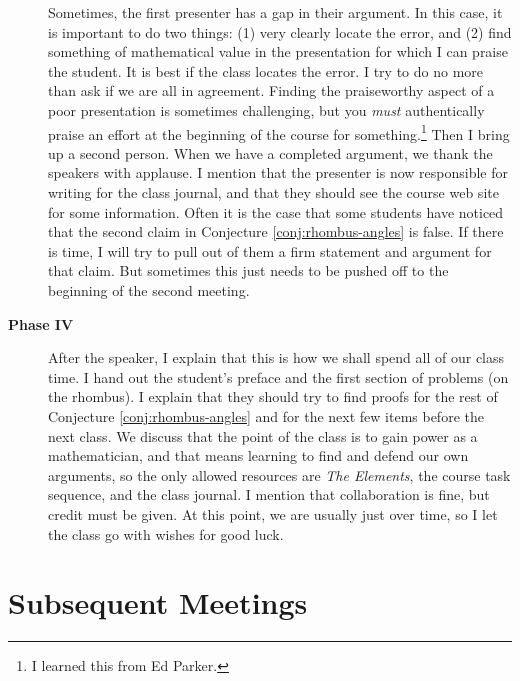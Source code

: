 \begin{annotation}
\begin{description}
Sometimes, the first presenter has a gap in their argument. 
In this case, it is important to do two things: (1) very clearly locate the error, and (2) find something of mathematical value in the presentation for which I can praise the student.
It is best if the class locates the error.
I try to do no more than ask if we are all in agreement.
Finding the praiseworthy aspect of a poor presentation is sometimes challenging, but you \emph{must} authentically praise an effort at the beginning of the course for something.\footnote{I learned this from Ed Parker.}
Then I bring up a second person.
When we have a completed argument, we thank the speakers with applause. I mention that the presenter is now responsible for writing for the class journal, and that they should see the course web site for some information.
Often it is the case that some students have noticed that the second claim in Conjecture \ref{conj:rhombus-angles} is false. If there is time, I will try to pull out of them a firm statement and argument for that claim. But sometimes this just needs to be pushed off to the beginning of the second meeting.
\\[.1in]

\item[\textbf{Phase IV}] After the speaker, I explain that this is how we shall spend all of our class time.
I hand out the student's preface and the first section of problems (on the rhombus).
I explain that they should try to find proofs for the rest of Conjecture \ref{conj:rhombus-angles} and for the next few items before the next class.
We discuss that the point of the class is to gain power as a mathematician, and that means learning to find and defend our own arguments, so the only allowed resources are \emph{The Elements}, the course task sequence, and the class journal.
I mention that collaboration is fine, but credit must be given.
At this point, we are usually just over time, so I let the class go with wishes for good luck.\\[.1in]
\end{description}

\section*{Subsequent Meetings}


\end{annotation}
